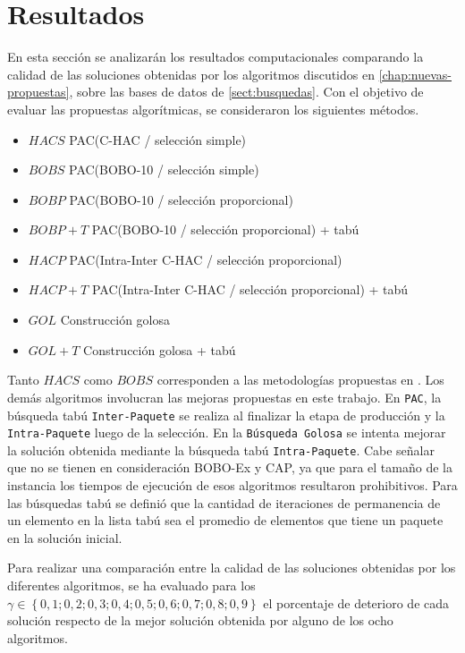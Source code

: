 \section{Resultados}\label{sect:resultados}

En esta sección se analizarán los resultados computacionales comparando la calidad de las soluciones obtenidas por los algoritmos discutidos en \autoref{chap:nuevas-propuestas}, sobre las bases de datos de \autoref{sect:busquedas}. Con el objetivo de evaluar las propuestas algorítmicas, se consideraron los siguientes métodos.

\begin{itemize}
\item{$HACS$} PAC(C-HAC / selección simple)
\item{$BOBS$} PAC(BOBO-10 / selección simple)
\item{$BOBP$} PAC(BOBO-10 / selección proporcional)
\item{$BOBP+T$} PAC(BOBO-10 / selección proporcional) + tabú
\item{$HACP$} PAC(Intra-Inter C-HAC / selección proporcional)
\item{$HACP+T$} PAC(Intra-Inter C-HAC / selección proporcional) + tabú
\item{$GOL$} Construcción golosa
\item{$GOL+T$} Construcción golosa + tabú
\end{itemize}

Tanto $HACS$ como $BOBS$ corresponden a las metodologías propuestas en \cite{journals/tkde/Amer-YahiaBCFMZ14}. Los demás algoritmos involucran las mejoras propuestas en este trabajo. En \texttt{PAC}, la búsqueda tabú \texttt{Inter-Paquete} se realiza al finalizar la etapa de producción y la \texttt{Intra-Paquete} luego de la selección. En la \texttt{Búsqueda Golosa} se intenta mejorar la solución obtenida mediante la búsqueda tabú \texttt{Intra-Paquete}. Cabe señalar que no se tienen en consideración BOBO-Ex y CAP, ya que para el tamaño de la instancia los tiempos de ejecución de esos algoritmos resultaron prohibitivos. Para las búsquedas tabú se definió que la cantidad de iteraciones de permanencia de un elemento en la lista tabú sea el promedio de elementos que tiene un paquete en la solución inicial.

Para realizar una comparación entre la calidad de las soluciones obtenidas por los diferentes algoritmos, se ha evaluado para los $\gamma \in \left\{0,1; 0,2; 0,3; 0,4; 0,5; 0,6; 0,7; 0,8; 0,9\right\}$ el porcentaje de deterioro de cada solución respecto de la mejor solución obtenida por alguno de los ocho algoritmos.

